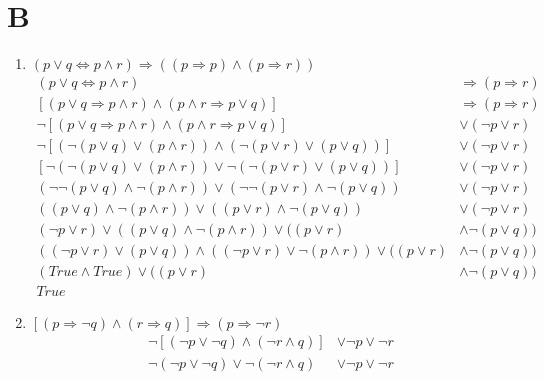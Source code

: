 \documentclass[11pt]{scrartcl}
\begin{document}
\section{B}
\begin{enumerate}[label=\alph*.]
	\item{
		$(p \lor q \Leftrightarrow p \land r) \Rightarrow ((p \Rightarrow p) \land (p \Rightarrow r))$\\
		\begin{align*}
			(p \lor q \Leftrightarrow p \land r) & \Rightarrow (p \Rightarrow r) \tag{Transitivity}\\
			[(p \lor q \Rightarrow p \land r) \land (p \land r \Rightarrow p \lor q)] & \Rightarrow (p \Rightarrow r) \tag{Def. of bicondtional}\\
			\lnot [(p \lor q \Rightarrow p \land r) \land (p \land r \Rightarrow p \lor q)] & \lor (\lnot p \lor r) \tag{Material Implication}\\
			\lnot [(\lnot (p \lor q) \lor (p \land r)) \land (\lnot(p \lor r) \lor (p \lor q))] & \lor (\lnot p \lor r) \tag{Material Implication}\\
			[\lnot(\lnot (p \lor q) \lor (p \land r)) \lor \lnot(\lnot(p \lor r) \lor (p \lor q))] & \lor (\lnot p \lor r) \tag{De Morgan's Law}\\
			(\lnot \lnot (p \lor q) \land \lnot (p \land r)) \lor (\lnot \lnot(p \lor r) \land \lnot (p \lor q)) & \lor (\lnot p \lor r) \tag{De Morgan's Law}\\
			((p \lor q) \land \lnot (p \land r)) \lor ((p \lor r) \land \lnot (p \lor q)) & \lor (\lnot p \lor r) \tag{Double negation}\\
			(\lnot p \lor r) \lor ((p \lor q) \land \lnot (p \land r)) \lor ((p \lor r) & \land \lnot (p \lor q)) \tag{Commutative}\\
			((\lnot p \lor r) \lor (p \lor q)) \land ((\lnot p \lor r) \lor \lnot (p \land r)) \lor ((p \lor r) & \land \lnot (p \lor q)) \tag{Distributive} \\
			(True \land True) \lor ((p \lor r) &\land \lnot (p \lor q)) \tag{Excluded middle}\\
			True
		\end{align*}	
	}
	\item{
		$[(p \Rightarrow \lnot q) \land (r \Rightarrow q)] \Rightarrow (p \Rightarrow \lnot r)$
		\begin{align*}
			\lnot [(\lnot p \lor \lnot q) \land (\lnot r \land q)] & \lor \lnot p \lor \lnot r \tag{Material Implication}\\
			\lnot (\lnot p \lor \lnot q) \lor \lnot(\lnot r \land q) & \lor \lnot p \lor \lnot r \tag{De Morgan's Law}\\

\end{align*}}
\end{enumerate}
\end{document}
